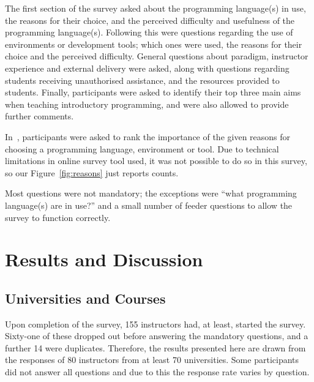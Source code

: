 \documentclass{sig-alternate}
\begin{document}
The first section of the survey asked about the programming
language(s) in use, the reasons for their choice, and the perceived
difficulty and usefulness of the programming language(s). Following
this were questions regarding the use of environments or development
tools; which ones were used, the reasons for their choice and the
perceived difficulty. General questions about paradigm, instructor
experience and external delivery were asked, along with questions
regarding students receiving unauthorised assistance, and the
resources provided to students. Finally, participants were asked to
identify their top three main aims when teaching introductory
programming, and were also allowed to provide further comments.

In~\cite{mason+cooper:2014}, participants were asked to rank the
importance of the given reasons for choosing a programming language,
environment or tool. Due to technical limitations in online survey
tool used, it was not possible to do so in this survey, so our
Figure~\ref{fig:reasons} just reports counts.

Most questions were not mandatory; the exceptions were ``what
programming language(s) are in use?'' and a small number of feeder
questions to allow the survey to function correctly.

\section{Results and Discussion}\label{results}

\subsection{Universities and Courses}

Upon completion of the survey, 155 instructors had, at least, started
the survey. Sixty-one of these dropped out before answering the
mandatory questions, and a further 14 were duplicates. Therefore, the
results presented here are drawn from the responses of 80 instructors
from at least 70 universities. Some participants did not answer all
questions and due to this the response rate varies by question.
\end{document}
